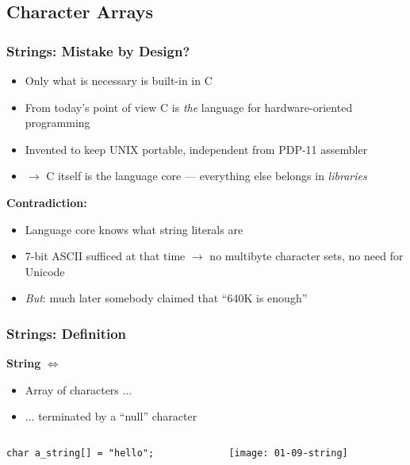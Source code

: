 \subsection{Character Arrays}

\begin{frame}
  \frametitle{Strings: Mistake by Design?}

  \begin{itemize}
  \item Only what is necessary is built-in in C
  \item From today's point of view C is \textit{the} language for
    hardware-oriented programming
  \item Invented to keep UNIX portable, independent from PDP-11 assembler
  \item $\to$ C itself is the language core --- everything else
    belongs in \textit{libraries}
  \end{itemize}

  \textbf{Contradiction:}

  \begin{itemize}
  \item Language core knows what string literals are
  \item 7-bit ASCII sufficed at that time $\to$ no multibyte character
    sets, no need for Unicode
  \item \textit{But}: much later somebody claimed that ``640K is
    enough''
  \end{itemize}
    
\end{frame}

\begin{frame}[fragile]
  \frametitle{Strings: Definition}

  \textbf{String} $\iff$ 

  \begin{itemize}
  \item Array of characters ...
  \item ... terminated by a ``null'' character
  \end{itemize}

  \begin{block}{}
    \begin{columns}[c]
      \begin{column}{.5\textwidth}
        \begin{block}{}
\begin{verbatim}
char a_string[] = "hello";
\end{verbatim}
        \end{block}
      \end{column}
      \begin{column}{.4\textwidth}
        \texttt{[image: 01-09-string]}
      \end{column}
    \end{columns}
  \end{block}

\end{frame}

